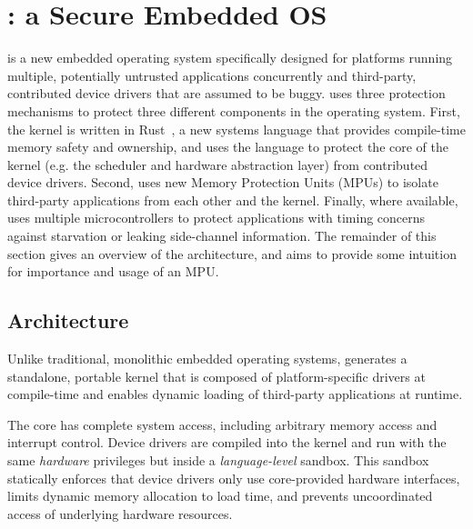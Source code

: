 \section{\name: a Secure Embedded OS}
\label{sec:os}

\name is a new embedded operating system
specifically designed for platforms running multiple, potentially untrusted
applications concurrently and third-party, contributed device drivers that are
assumed to be buggy. \name uses three protection mechanisms to protect three
different components in the operating system.
First, the kernel is written in Rust~\cite{rust}, a new systems language that provides
compile-time memory safety and ownership, and uses the language to protect the
core of the kernel (e.g. the scheduler and hardware abstraction layer) from
contributed device drivers.
Second, \name uses new Memory Protection Units (MPUs) to isolate third-party
applications from each other and the kernel.
Finally, where available, \name uses multiple microcontrollers to protect
applications with timing concerns against starvation or leaking side-channel
information.
The remainder of this section gives an overview of the \name architecture,
and aims to provide some intuition for importance and usage of an MPU.

\subsection{Architecture}
\label{sec:os-arch}


Unlike traditional, monolithic embedded operating systems, \name generates a
standalone, portable kernel that is composed of platform-specific drivers at
compile-time and enables dynamic loading of third-party applications at
runtime.

The \name core has complete system access, including arbitrary memory
access and interrupt control. Device drivers are compiled into the kernel and
run with the same \emph{hardware} privileges but inside a
\emph{language-level} sandbox. This sandbox statically enforces that device
drivers only use core-provided hardware interfaces, limits dynamic memory
allocation to load time, and prevents uncoordinated access of underlying
hardware resources.

